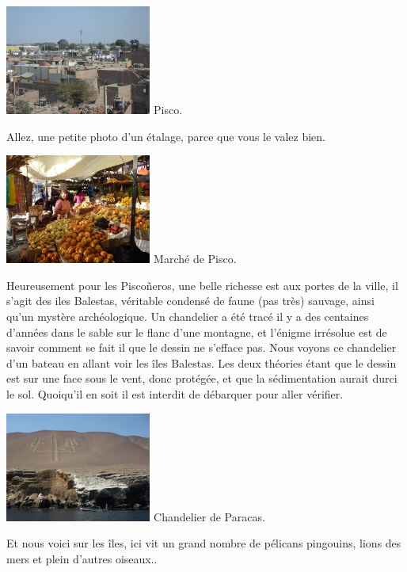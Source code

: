 \begin{multicols}{2}
\hspace*{-0.65cm}
\includegraphics[width=4.8cm]{articles/Cote-du-sud/12559974777RC0.jpg}
Pisco.


Allez, une petite photo d'un étalage, parce que vous le valez bien.

\hspace*{-0.65cm}
\includegraphics[width=4.8cm]{articles/Cote-du-sud/1255997490cIfD.jpg}
Marché de Pisco.


Heureusement pour les Piscoñeros, une belle richesse est aux portes de la ville, il s'agit des iles Balestas, véritable condensé de faune (pas très) sauvage, ainsi qu'un mystère archéologique. Un chandelier a été tracé il y a des centaines d'années dans le sable sur le flanc d'une montagne, et l'énigme irrésolue est de savoir comment se fait il que le dessin ne s'efface pas. Nous voyons ce chandelier d'un bateau en allant voir les îles Balestas. Les deux théories étant que le dessin est sur une face sous le vent, donc protégée, et que la sédimentation aurait durci le sol. Quoiqu'il en soit il est interdit de débarquer pour aller vérifier.

\hspace*{-0.65cm}
\includegraphics[width=4.8cm]{articles/Cote-du-sud/1255997496rIn7.jpg}
Chandelier de Paracas.


Et nous voici sur les îles, ici vit un grand nombre de pélicans pingouins, lions des mers et plein d'autres oiseaux..


\end{multicols}

